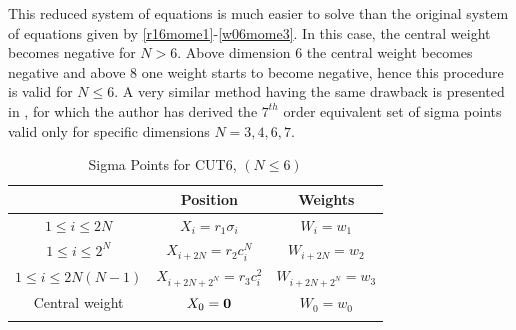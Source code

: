 \documentclass[letterpaper, 10 pt, conference]{IEEEtran}  %
\newcommand{\comments}[1]{}
\begin{document}
This reduced system of equations is much easier to solve than the original system of equations given by \eqref{r16mome1}-\eqref{w06mome3}. In this case, the central weight becomes negative for $N>6$. Above dimension 6 the central weight becomes negative and above 8 one weight starts to become negative, hence this procedure is valid for $N\le6$. A very similar method having the same drawback is presented in \cite{str7d}, for which the author has derived the $7^{th}$ order equivalent set of sigma points valid only for specific dimensions $N=3,4,6,7$.
\begin{table}
\caption{Sigma Points for CUT6, $(N\le6)$ } \vspace{-0.2in}

\small
\label{sigpointscut6N6}
\begin{center}
\begin{tabular}{c|c|c}
&Position & Weights\\
\hline
\hline
$1\le i\le 2N$ & $X_i=r_1\sigma_i$ & $W_i=w_1$\\
\hline\noalign{\smallskip}
$1 \le i \le 2^N$ & $X_{i+2N}=r_2c^N_i$ & $W_{i+2N}=w_2$\\
\hline\noalign{\smallskip}
$1 \le i \le 2N(N-1)$ & $X_{i+2N+2^N}=r_3c^2_i$ & $W_{i+2N+2^N}=w_3$\\
\hline\noalign{\smallskip}
Central weight & $X_{0}={\bf 0} $ & $W_{0}=w_0$\\
\hline\noalign{\smallskip}
\multicolumn{3}{c}{$n=2N^2+2^N+1$} \\
\hline
\end{tabular}
\end{center}\vspace{-0.3in}
\end{table} 
\end{document}
